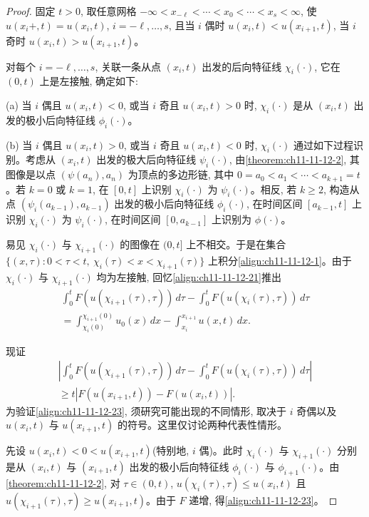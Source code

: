 \documentclass[../../main.tex]{subfiles}
\begin{document}
\begin{proof}
固定 $t>0$, 取任意网格 $-\infty<x_{-\ell}<\cdots<x_0<\cdots<x_s<\infty$, 使 $u(x_i+,t)=u(x_i,t)$, $i=-\ell,\ldots,s$, 且当 $i$ 偶时 $u(x_i,t)<u(x_{i+1},t)$, 当 $i$ 奇时 $u(x_i,t)>u(x_{i+1},t)$。

对每个 $i=-\ell,\ldots,s$, 关联一条从点 $(x_i,t)$ 出发的后向特征线 $\chi_i(\cdot)$, 它在 $(0,t)$ 上是左接触, 确定如下:

(a) 当 $i$ 偶且 $u(x_i,t)<0$, 或当 $i$ 奇且 $u(x_i,t)>0$ 时, $\chi_i(\cdot)$ 是从 $(x_i,t)$ 出发的极小后向特征线 $\phi_i(\cdot)$。

(b) 当 $i$ 偶且 $u(x_i,t)>0$, 或当 $i$ 奇且 $u(x_i,t)<0$ 时, $\chi_i(\cdot)$ 通过如下过程识别。考虑从 $(x_i,t)$ 出发的极大后向特征线 $\psi_i(\cdot)$, 由\cref{theorem:ch11-11-12-2}, 其图像是以点 $(\psi(a_n),a_n)$ 为顶点的多边形链, 其中 $0=a_0<a_1<\cdots<a_{k+1}=t$。若 $k=0$ 或 $k=1$, 在 $[0,t]$ 上识别 $\chi_i(\cdot)$ 为 $\psi_i(\cdot)$。相反, 若 $k\geqslant2$, 构造从点 $(\psi_i(a_{k-1}),a_{k-1})$ 出发的极小后向特征线 $\phi_i(\cdot)$, 在时间区间 $[a_{k-1},t]$ 上识别 $\chi_i(\cdot)$ 为 $\psi_i(\cdot)$, 在时间区间 $[0,a_{k-1}]$ 上识别为 $\phi(\cdot)$。

易见 $\chi_i(\cdot)$ 与 $\chi_{i+1}(\cdot)$ 的图像在 $(0,t]$ 上不相交。于是在集合 $\{(x,\tau):0<\tau<t,\ \chi_i(\tau)<x<\chi_{i+1}(\tau)\}$ 上积分\eqref{align:ch11-11-12-1}。由于 $\chi_i(\cdot)$ 与 $\chi_{i+1}(\cdot)$ 均为左接触, 回忆\eqref{align:ch11-11-12-21}推出
\begin{align}
\int_0^t F(u(\chi_{i+1}(\tau),\tau))\,d\tau-\int_0^t F(u(\chi_i(\tau),\tau))\,d\tau\nonumber\\
=\int_{\chi_i(0)}^{\chi_{i+1}(0)}u_0(x)\,dx-\int_{x_i}^{x_{i+1}}u(x,t)\,dx.\label{align:ch11-11-12-22}
\end{align}

现证
\begin{align}
\left|\int_0^t F(u(\chi_{i+1}(\tau),\tau))\,d\tau-\int_0^t F(u(\chi_i(\tau),\tau))\,d\tau\right|\nonumber\\
\geqslant t|F(u(x_{i+1},t))-F(u(x_i,t))|.\label{align:ch11-11-12-23}
\end{align}
为验证\eqref{align:ch11-11-12-23}, 须研究可能出现的不同情形, 取决于 $i$ 奇偶以及 $u(x_i,t)$ 与 $u(x_{i+1},t)$ 的符号。这里仅讨论两种代表性情形。

先设 $u(x_i,t)<0<u(x_{i+1},t)$(特别地, $i$ 偶)。此时 $\chi_i(\cdot)$ 与 $\chi_{i+1}(\cdot)$ 分别是从 $(x_i,t)$ 与 $(x_{i+1},t)$ 出发的极小后向特征线 $\phi_i(\cdot)$ 与 $\phi_{i+1}(\cdot)$。由\cref{theorem:ch11-11-12-2}, 对 $\tau\in(0,t)$, $u(\chi_i(\tau),\tau)\leqslant u(x_i,t)$ 且 $u(\chi_{i+1}(\tau),\tau)\geqslant u(x_{i+1},t)$。由于 $F$ 递增, 得\eqref{align:ch11-11-12-23}。


\end{proof}
\end{document}
